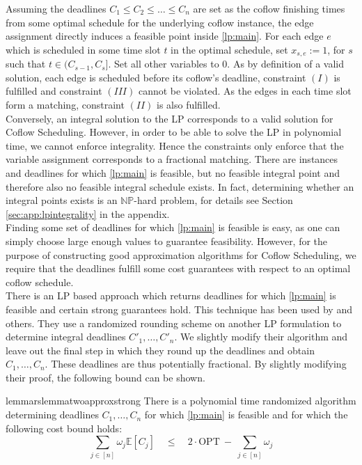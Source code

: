 \documentclass[11pt]{article}
\begin{document}
Assuming the deadlines $C_1 \le C_2 \le \dotsc \le C_n$ are set as the coflow finishing times from some optimal schedule for the underlying coflow instance, the edge assignment directly induces a feasible point inside \ref{lp:main}. For each edge $e$ which is scheduled in some time slot $t$ in the optimal schedule, set $x_{s,e} := 1$, for $s$ such that $t \in (C_{s-1},C_{s}]$. Set all other variables to $0$. As by definition of a valid solution, each edge is scheduled before its coflow's deadline, constraint $(I)$ is fulfilled and constraint $(III)$ cannot be violated. As the edges in each time slot form a matching, constraint $(II)$ is also fulfilled.\\

Conversely, an integral solution to the LP corresponds to a valid solution for Coflow Scheduling. However, in order to be able to solve the LP in polynomial time, we cannot enforce integrality. Hence the constraints only enforce that the variable assignment corresponds to a fractional matching. There are instances and deadlines for which \ref{lp:main} is feasible, but no feasible integral point and therefore also no feasible integral schedule exists. In fact, determining whether an integral points exists is an $\mathbb{NP}$-hard problem, for details see Section \ref{sec:app:lpintegrality} in the appendix.\\

Finding some set of deadlines for which \ref{lp:main} is feasible is easy, as one can simply choose large enough values to guarantee feasibility. However, for the purpose of constructing good approximation algorithms for Coflow Scheduling, we require that the deadlines fulfill some cost guarantees with respect to an optimal coflow schedule.\\
There is an LP based approach which returns deadlines for which \ref{lp:main} is feasible and certain strong guarantees hold. This technique has been used by \cite{im19,fukunaga22} and others. They use a randomized rounding scheme on another LP formulation to determine integral deadlines $C'_1,\dotsc, C'_n$. We slightly modify their algorithm and leave out the final step in which they round up the deadlines and obtain $C_1,\dotsc,C_n$. These deadlines are thus potentially fractional. By slightly modifying their proof, the following bound can be shown.

\begin{restatable}[\cite{im19}]{lemma}{rslemmatwoapproxstrong}\label{lemma:2approxstrong}
There is a polynomial time randomized algorithm determining deadlines $C_1,\dotsc,C_n$ for which \ref{lp:main} is feasible and for which the following cost bound holds: 
\begin{equation*}
\sum_{j \in [n]} \omega_j \mathbb{E}[C_j] \quad  \le \quad  2\cdot \mathrm{OPT} \ -\  \sum_{j \in [n]}\omega_j
\end{equation*}
\end{restatable}
\end{document}

